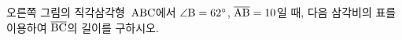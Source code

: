 \noindent\begin{minipage}[t]{0.58\linewidth}\vspace{0pt}\raggedright 오른쪽 그림의 직각삼각형~$\mathrm{ABC}$에서 $\angle\mathrm{B}=62^\circ$, $\overline{\mathrm{AB}}=10$일 때, 다음 삼각비의 표를 이용하여 $\overline{\mathrm{BC}}$의 길이를 구하시오.\end{minipage}\hfill\begin{minipage}[t]{0.4\linewidth}\vspace{0pt}\centering \resizebox{\ifdim\width>\linewidth\linewidth\else\width\fi}{!}{}\end{minipage}\par
\par\smallskip\begin{center}\resizebox{\ifdim\width>\linewidth\linewidth\else\width\fi}{!}{}\end{center}
